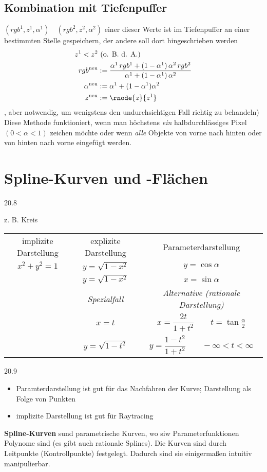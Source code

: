 \section{Kombination mit Tiefenpuffer}
$(rgb^1, z^1, \alpha^1)\quad(rgb^2, z^2, \alpha^2)$ einer dieser Werte ist im Tiefenpuffer an einer bestimmten Stelle gespeichern,
	der andere soll dort hingeschrieben werden
\begin{align*}
 z^1 < z^2 &\ \text{(o. B. d. A.)}\\
 rgb^\mathrm{neu} &:= \frac{\alpha^1\,rgb^1 + (1-\alpha^1)\,\alpha^2\,rgb^2}{\alpha^1+(1-\alpha^1)\,\alpha^2}\\
 \alpha^\mathrm{neu} &:= \alpha^1 + (1-\alpha^1) \alpha^2\\
 z^\mathrm{neu} &:= \rnode{z}{z^1} 
\end{align*}
, aber notwendig, um wenigstens den undurchsichtigen Fall richtig zu behandeln)
\\[1em]
Diese Methode funktioniert, wenn man höchstens \emph{ein} halbdurchlässiges Pixel $(0 < \alpha < 1)$ zeichen möchte
oder wenn \emph{alle} Objekte von vorne nach hinten oder von hinten nach vorne eingefügt werden.

\chapter{Spline-Kurven und -Flächen}
\begin{center}
 20.8
\end{center}
z. B. Kreis
\begin{center}
\begin{tabular}{ccc}
implizite Darstellung & explizite Darstellung & Parameterdarstellung \\
$x^2 + y^2 = 1$		& $y = \sqrt{1 - x^2}$	& $y = \cos \alpha$  \\
			& $y = \sqrt{1 - x^2}$	& $x = \sin \alpha$ \\
		 \hline
			& \emph{Spezialfall}	& \emph{Alternative (rationale Darstellung)} \\
			& $x = t$		& $x = \dfrac{2t}{1+t^2} \qquad t = \tan \frac{\alpha}{2}$\\
			& $y = \sqrt{1 - t^2}$	& $y = \dfrac{1-t^2}{1+t^2} \qquad -\infty < t < \infty$
\end{tabular}
\end{center}
\begin{center}
 20.9
\end{center}
\begin{itemize}
 \item Paramterdarstellung ist gut für das Nachfahren der Kurve; Darstellung als Folge von Punkten
 \item implizite Darstellung ist gut für Raytracing
\end{itemize}
\Defi	\textbf{Spline-Kurven} sund parametrische Kurven, wo siw Parameterfunktionen Polynome sind (es gibt auch
	rationale Splines). Die Kurven sind durch Leitpunkte (Kontrollpunkte) festgelegt. Dadurch sind sie einigermaßen
	intuitiv manipulierbar.

